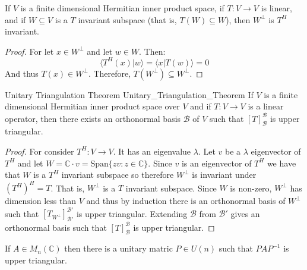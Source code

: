 \documentclass[crop=false,class=article]{standalone}                           %
\begin{document}
        \begin{theorem}
            If $V$ is a finite dimensional Hermitian inner product space, if
            $T:V\rightarrow{V}$ is linear, and if $W\subseteq{V}$ is a $T$
            invariant subspace (that is, $T(W)\subseteq{W}$), then
            $W^{\perp}$ is $T^{H}$ invariant.
        \end{theorem}
        \begin{proof}
            For let $x\in{W}^{\perp}$ and let $w\in{W}$. Then:
            \begin{equation}
                \langle{T}^{H}(x)|w\rangle
                =\langle{x}|T(w)\rangle=0
            \end{equation}
            And thus $T(x)\in{W}^{\perp}$. Therefore,
            $T(W^{\perp})\subseteq{W}^{\perp}$.
        \end{proof}
        \begin{ltheorem}{Unitary Triangulation Theorem}
                        {Unitary_Triangulation_Theorem}
            If $V$ is a finite dimensional Hermitian inner product space over
            $V$ and if $T:V\rightarrow{V}$ is a linear operator, then there
            exists an orthonormal basis $\mathscr{B}$ of $V$ such that
            $[T]_{\mathscr{B}}^{\mathscr{B}}$ is upper triangular.
        \end{ltheorem}
        \begin{proof}
            For consider $T^{H}:V\rightarrow{V}$. It has an eigenvalue
            $\lambda$. Let $v$ be a $\lambda$ eigenvector of $T^{H}$ and let
            $W=\mathbb{C}\cdot{v}=\textrm{Span}\{zv:z\in\mathbb{C}\}$. Since
            $v$ is an eigenvector of $T^{H}$ we have that $W$ is a $T^{H}$
            invariant subspace so therefore $W^{\perp}$ is invariant under
            $(T^{H})^{H}=T$. That is, $W^{\perp}$ is a $T$ invariant subspace.
            Since $W$ is non-zero, $W^{\perp}$ has dimension less than $V$ and
            thus by induction there is an orthonormal basis of $W^{\perp}$ such
            that $[T_{W^{\perp}}]_{\mathscr{B}'}^{\mathscr{B}'}$ is upper
            triangular. Extending $\mathscr{B}$ from $\mathscr{B}'$ gives an
            orthonormal basis such that $[T]_{\mathscr{B}}^{\mathscr{B}}$ is
            upper triangular.
        \end{proof}
        \begin{theorem}
            If $A\in{M}_{n}(\mathbb{C})$ then there is a unitary matric
            $P\in{U}(n)$ such that $PAP^{\minus{1}}$ is upper triangular.
        \end{theorem}
\end{document}
